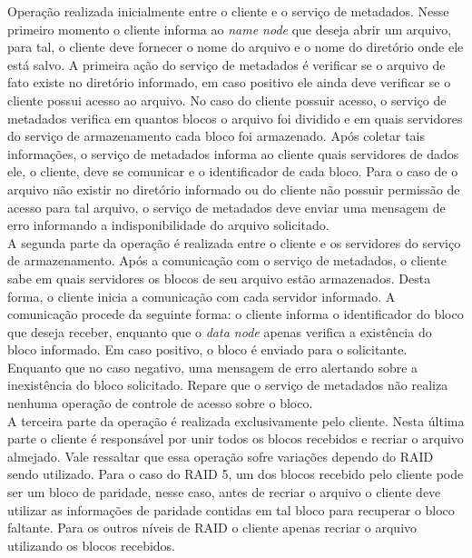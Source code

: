 Operação realizada inicialmente entre o cliente e o serviço de metadados. Nesse primeiro momento o cliente informa ao \textit{name node} que deseja abrir um arquivo, para tal, o cliente deve fornecer o nome do arquivo e o nome do diretório onde ele está salvo. A primeira ação do serviço de metadados é verificar se o arquivo de fato existe no diretório informado, em caso positivo ele ainda deve verificar se o cliente possui acesso ao arquivo. No caso do cliente possuir acesso, o serviço de metadados verifica em quantos blocos o arquivo foi dividido e em quais servidores do serviço de armazenamento cada bloco foi armazenado. Após coletar tais informações, o serviço de metadados informa ao cliente quais servidores de dados ele, o cliente, deve se comunicar e o identificador de cada bloco. Para o caso de o arquivo não existir no diretório informado ou do cliente não possuir permissão de acesso para tal arquivo, o serviço de metadados deve enviar uma mensagem de erro informando a indisponibilidade do arquivo solicitado. 
\\

A segunda parte da operação é realizada entre o cliente e os servidores do serviço de armazenamento. Após a comunicação com o serviço de metadados, o cliente sabe em quais servidores os blocos de seu arquivo estão armazenados. Desta forma, o cliente inicia a comunicação com cada servidor informado. A comunicação procede da seguinte forma: o cliente informa o identificador do bloco que deseja receber, enquanto que o \textit{data node} apenas verifica a existência do bloco informado. Em caso positivo, o bloco é enviado para o solicitante. Enquanto que no caso negativo, uma mensagem de erro alertando sobre a inexistência do bloco solicitado. Repare que o serviço de metadados não realiza nenhuma operação de controle de acesso sobre o bloco.
\\

A terceira parte da operação é realizada exclusivamente pelo cliente. Nesta última parte o cliente é responsável por unir todos os blocos recebidos e recriar o arquivo almejado.  Vale ressaltar que essa operação sofre variações dependo do RAID sendo utilizado. Para o caso do RAID 5, um dos blocos recebido pelo cliente pode ser um bloco de paridade, nesse caso, antes de recriar o arquivo o cliente deve utilizar as informações de paridade contidas em tal bloco para recuperar o bloco faltante. Para os outros níveis de RAID o cliente apenas recriar o arquivo utilizando os blocos recebidos.
\\

